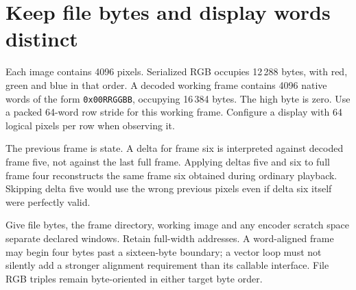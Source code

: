 \section{Keep file bytes and display words distinct}
Each image contains 4096 pixels. Serialized RGB occupies 12\,288 bytes, with red,
green and blue in that order. A decoded working frame contains 4096 native words
of the form \texttt{0x00RRGGBB}, occupying 16\,384 bytes. The high byte is zero.
Use a packed 64-word row stride for this working frame. Configure a display with
64 logical pixels per row when observing it.

The previous frame is state. A delta for frame six is interpreted against decoded
frame five, not against the last full frame. Applying deltas five and six to full
frame four reconstructs the same frame six obtained during ordinary playback.
Skipping delta five would use the wrong previous pixels even if delta six itself
were perfectly valid.

Give file bytes, the frame directory, working image and any encoder scratch space
separate declared windows. Retain full-width addresses. A word-aligned frame may
begin four bytes past a sixteen-byte boundary; a vector loop must not silently add
a stronger alignment requirement than its callable interface. File RGB triples
remain byte-oriented in either target byte order.
